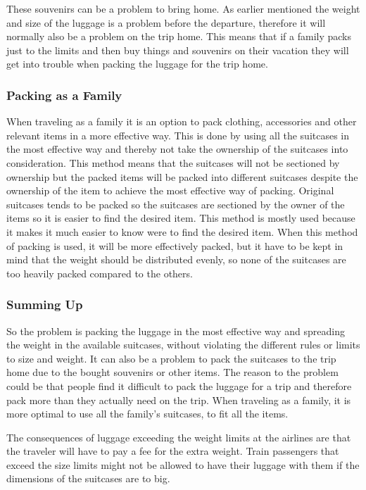 These souvenirs can be a problem to bring home. As earlier mentioned the weight and size of the luggage is a problem before the departure, therefore it will normally also be a problem on the trip home.
This means that if a family packs just to the limits and then buy things and souvenirs on their vacation they will get into trouble when packing the luggage for the trip home.

\subsubsection{Packing as a Family}
When traveling as a family it is an option to pack clothing, accessories and other relevant items in a more effective way. This is done by using all the suitcases in the most effective way and thereby not take the ownership of the suitcases into consideration. This method means that the suitcases will not be sectioned by ownership but the packed items will be packed into different suitcases despite the ownership of the item to achieve the most effective way of packing. Original suitcases tends to be packed so the suitcases are sectioned by the owner of the items so it is easier to find the desired item. This method is mostly used because it makes it much easier to know were to find the desired item. When this method of packing is used, it will be more effectively packed, but it have to be kept in mind that the weight should be distributed evenly, so none of the suitcases are too heavily packed compared to the others.

\subsubsection{Summing Up}
So the problem is packing the luggage in the most effective way and spreading the weight in the available suitcases, without violating the different rules or limits to size and weight. It can also be a problem to pack the suitcases to the trip home due to the bought souvenirs or other items. The reason to the problem could be that people find it difficult to pack the luggage for a trip and therefore pack more than they actually need on the trip. When traveling as a family, it is more optimal to use all the family's suitcases, to fit all the items. 

The consequences of luggage exceeding the weight limits at the airlines are that the traveler will have to pay a fee for the extra weight.
Train passengers that exceed the size limits might not be allowed to have their luggage with them if the dimensions of the suitcases are to big.
